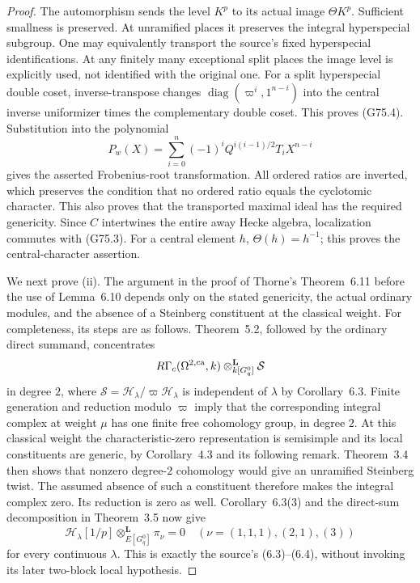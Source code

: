 \begin{proof}
The automorphism sends the level \(K^p\) to its actual image
\(\Theta K^p\).  Sufficient smallness is preserved.
At unramified places it preserves the integral hyperspecial subgroup.
One may equivalently transport the source's fixed hyperspecial
identifications.  At any finitely many exceptional split places the
image level is explicitly used, not identified with the original one.
For a split hyperspecial double coset, inverse-transpose changes
\(\operatorname{diag}(\varpi^i,1^{n-i})\) into the central inverse
uniformizer times the complementary double coset.  This proves
(G75.4).  Substitution into the polynomial
\[
 P_w(X)=\sum_{i=0}^n(-1)^iQ^{i(i-1)/2}T_iX^{n-i}
\]
gives the asserted Frobenius-root transformation.
All ordered ratios are inverted, which preserves the condition that
no ordered ratio equals the cyclotomic character.
This also proves that the transported maximal ideal has the required
genericity.  Since \(C\) intertwines the entire away Hecke algebra,
localization commutes with (G75.3).
For a central element \(h\), \(\Theta(h)=h^{-1}\); this proves the
central-character assertion.

We next prove (ii).  The argument in the proof of Thorne's
Theorem~6.11 before the use of Lemma~6.10 depends only on the stated
genericity, the actual ordinary modules, and the absence of a
Steinberg constituent at the classical weight.
For completeness, its steps are as follows.
Theorem~5.2, followed by the ordinary direct summand, concentrates
\[
 R\Gamma_c(\Omega^{2,{\rm ca}},k)
           \otimes^{\mathbf L}_{k[G_q^0]}\mathcal S
\]
in degree \(2\), where
\(\mathcal S=\mathcal H_\lambda/\varpi\mathcal H_\lambda\) is independent
of \(\lambda\) by Corollary~6.3.
Finite generation and reduction modulo \(\varpi\) imply that the
corresponding integral complex at weight \(\mu\) has one finite free
cohomology group, in degree \(2\).
At this classical weight the characteristic-zero representation is
semisimple and its local constituents are generic, by Corollary~4.3
and its following remark.  Theorem~3.4 then shows that nonzero
degree-\(2\) cohomology would give an unramified Steinberg twist.
The assumed absence of such a constituent therefore makes the integral
complex zero.  Its reduction is zero as well.
Corollary~6.3(3) and the direct-sum decomposition in Theorem~3.5 now give
\[
 \mathcal H_\lambda[1/p]\otimes^{\mathbf L}_{E[G_q^0]}\pi_\nu=0
       \quad(\nu=(1,1,1),(2,1),(3))
 \tag{G75.8}
\]
for every continuous \(\lambda\).
This is exactly the source's (6.3)--(6.4), without invoking its later
two-block local hypothesis.


\end{proof}
